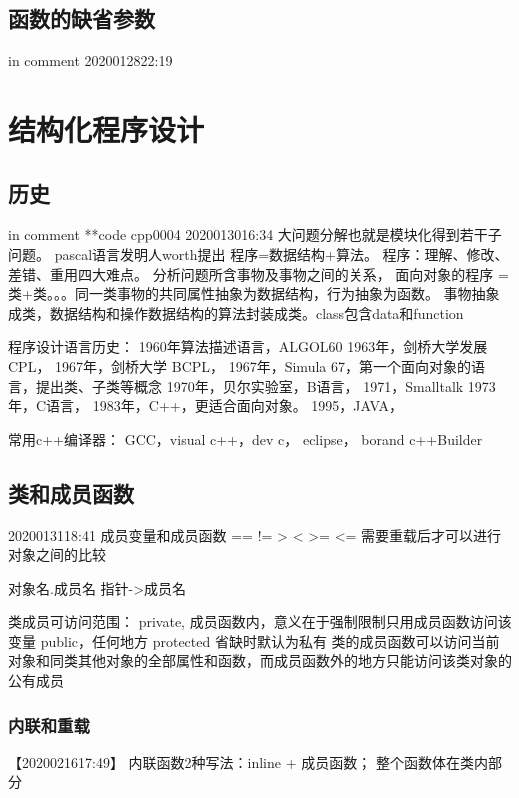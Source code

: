 \documentclass[UTF8]{article}
\begin{document}
\subsection{函数的缺省参数}
in comment
2020012822:19
\begin{comment}
最右边的若干连续参数可以缺省
void func(int x1, int x2 = 2, int x3 = 3){}
用处在于函数添加新参数时不需要修改原来不用新参数的对函数的调用。比如说原来写的单色的绘图函数加上可选颜色的属性。

\end{comment}



\section{结构化程序设计}
\subsection{历史}
in comment
**code cpp0004
2020013016:34
大问题分解也就是模块化得到若干子问题。
pascal语言发明人worth提出 程序=数据结构+算法。
程序：理解、修改、差错、重用四大难点。
分析问题所含事物及事物之间的关系，
面向对象的程序 = 类+类。。。同一类事物的共同属性抽象为数据结构，行为抽象为函数。
事物抽象成类，数据结构和操作数据结构的算法封装成类。class包含data和function



程序设计语言历史：
1960年算法描述语言，ALGOL60
1963年，剑桥大学发展 CPL，
1967年，剑桥大学 BCPL，
1967年，Simula 67，第一个面向对象的语言，提出类、子类等概念
1970年，贝尔实验室，B语言，
1971，Smalltalk
1973年，C语言，
1983年，C++，更适合面向对象。
1995，JAVA，


常用c++编译器：
GCC，visual c++，dev c， eclipse， borand c++Builder


\subsection{类和成员函数}
2020013118:41
成员变量和成员函数
== != > < >= <= 需要重载后才可以进行对象之间的比较

对象名.成员名
指针->成员名


类成员可访问范围：
private, 成员函数内，意义在于强制限制只用成员函数访问该变量
public，任何地方
protected
省缺时默认为私有
类的成员函数可以访问当前对象和同类其他对象的全部属性和函数，而成员函数外的地方只能访问该类对象的公有成员

\subsubsection{内联和重载}
【2020021617:49】
内联函数2种写法：inline + 成员函数； 整个函数体在类内部分
\end{document}
